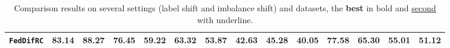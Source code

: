 \begin{table}[t]
{\begin{tabular}{lccccccccccccc}
    \cmidrule(lr){1-14}
    \rowcolor{myye} \texttt{FedDifRC} & \textbf{83.14} & \textbf{88.27} & \textbf{76.45} & \textbf{59.22} & \textbf{63.32} & \textbf{53.87} & \textbf{42.63} & \textbf{45.28} & \textbf{40.05} & \textbf{77.58} & \textbf{65.30} & \textbf{55.01} & \textbf{51.12} \\
    \bottomrule[1.0pt]
\end{tabular}}
\caption{Comparison results on several settings (label shift and imbalance shift) and datasets, the \textbf{best} in bold and \underline{second} with underline.}
\label{tab:tab3}
\end{table}
\begin{table}[t]
\renewcommand{\arraystretch}{1.0}
\centering
{}
\caption{Comparison results on Office-Caltech with domain shift.}
\label{tab:tab4}
\end{table}
